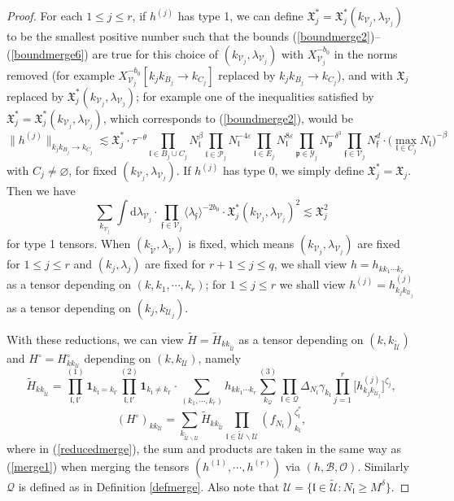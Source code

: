 \documentclass[11 pt,reqno]{amsart}
\theoremstyle{definition}
\theoremstyle{remark}
\numberwithin{equation}{section}
\newcommand{\Pc}{\mathcal{P}}
\newcommand{\Qc}{\mathcal{Q}}
\newcommand{\Uc}{\mathcal{U}}
\newcommand{\Vc}{\mathcal{V}}
\newcommand{\Yc}{\mathcal{Y}}
\newcommand{\pf}{\mathfrak{p}}
\newcommand{\ff}{\mathfrak{f}}
\newcommand{\Xf}{\mathfrak{X}}
\newcommand{\lf}{\mathfrak{l}}
\newcommand{\Bs}{\mathscr{B}}
\newcommand{\Os}{\mathscr{O}}
\begin{document}
{\begin{proof}
For each $1\leq j\leq r$, if $h^{(j)}$ has type 1, we can define $\Xf_j^*=\Xf_j^*(k_{\Vc_j},\lambda_{\Vc_j})$ to be the smallest positive number such that the bounds (\ref{boundmerge2})--(\ref{boundmerge6}) are true for this choice of $(k_{\Vc_j},\lambda_{\Vc_j})$ with $X_{\Vc_j}^{-b_0}$ in the norms removed (for example $X_{\Vc_j}^{-b_0}[k_jk_{B_j}\to k_{C_j}]$ replaced by $k_jk_{B_j}\to k_{C_j}$), and with $\Xf_j$ replaced by $\Xf_j^*(k_{\Vc_j},\lambda_{\Vc_j})$; for example one of the inequalities satisfied by $\Xf_j^*=\Xf_j^*(k_{\Vc_j},\lambda_{\Vc_j})$, which corresponds to (\ref{boundmerge2}), would be
\begin{equation}\label{eq:modified6.40}
\|h^{(j)}\|_{k_jk_{B_j}\to k_{C_j}}\lesssim\Xf_j^*\cdot\tau^{-\theta}\prod_{\lf\in B_j\cup C_j}N_\lf^\beta\prod_{\lf\in\Pc_j}N_\lf^{-4\varepsilon}\prod_{\lf\in E_j}N_\lf^{8\varepsilon}\prod_{\pf\in\Yc_j}N_\pf^{-\delta^3} \prod_{\ff \in \Vc_j} N_\ff^d\cdot \big(\max_{\lf\in C_j}N_\lf\big)^{-\beta}
\end{equation}
 with $C_j\neq\varnothing$, for fixed $(k_{\Vc_j},\lambda_{\Vc_j})$. If $h^{(j)}$ has type 0, we simply define $\Xf_j^*=\Xf_j$. Then we have
\begin{equation}\label{reducednorms}\sum_{k_{\Vc_j}}\int\mathrm{d}\lambda_{\Vc_j}\cdot\prod_{\ff\in\Vc_j}\langle \lambda_\ff\rangle^{-2b_0}\cdot\Xf_j^*(k_{\Vc_j},\lambda_{\Vc_j})^2\lesssim \Xf_j^2
\end{equation} for type 1 tensors. When $(k_{\widetilde{\Vc}},\lambda_{\widetilde{\Vc}})$ is fixed, which means $(k_{\Vc_j},\lambda_{\Vc_j})$ are fixed for $1\leq j\leq r$ and $(k_j,\lambda_j)$ are fixed for $r+1\leq j\leq q$, we shall view $h=h_{kk_1\cdots k_r}$ as a tensor depending on $(k,k_1,\cdots,k_r)$; for $1\leq j\leq r$ we shall view $h^{(j)}=h_{k_jk_{\Uc_j}}^{(j)}$ as a tensor depending on $(k_j,k_{\Uc_j})$.

With these reductions, we can view $\widetilde{H}=\widetilde{H}_{kk_{\widetilde{\Uc}}}$ as a tensor depending on $(k,k_{\widetilde{\Uc}})$ and $H^\circ=H_{kk_\Uc}^\circ$ depending on $(k,k_\Uc)$, namely
\begin{equation}\label{reducedmerge}\widetilde{H}_{kk_{\widetilde{\Uc}}}=\prod_{\lf,\lf'}^{(1)}\mathbf{1}_{k_\lf=k_{\lf'}}\prod_{\lf,\lf'}^{(2)}\mathbf{1}_{k_\lf\neq k_{\lf'}}\cdot\sum_{(k_1,\cdots,k_r)}h_{kk_1\cdots k_r}\sum_{k_{\Qc}}^{(3)}\prod_{\lf\in\Qc}\Delta_{N_\lf}\gamma_{k_\lf}\prod_{j=1}^{r}\big[h_{k_jk_{\Uc_j}}^{(j)}\big]^{\zeta_j},
\end{equation}
\begin{equation}\label{reducedtrim}(H^\circ)_{kk_\Uc}=\sum_{k_{\widetilde{\Uc}\backslash\Uc}}\widetilde{H}_{kk_{\widetilde{\Uc}}}\prod_{\lf\in \widetilde{\Uc}\backslash\Uc}(f_{N_\lf})_{k_\lf}^{\zeta_\lf^*},
\end{equation} where in (\ref{reducedmerge}), the sum and products are taken in the same way as (\ref{merge1}) when merging the tensors $(h^{(1)},\cdots,h^{(r)})$ via $(h,\Bs,\Os)$. Similarly $\Qc$ is defined as in Definition \ref{defmerge}. Also note that
$\Uc =\{\lf\in\widetilde{\Uc}:N_\lf\geq M^\delta\}$.


\end{proof}}
\end{document}
